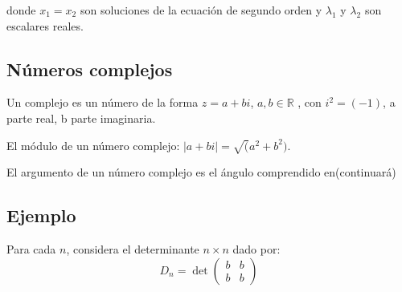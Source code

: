 \documentclass{article}
\begin{document}
donde $x_1=x_2$ son soluciones de la ecuación de segundo orden y $\lambda_1$ y $\lambda_2$ son escalares reales.

\subsection{Números  complejos}

Un complejo es un número de la forma $z=a+bi$, $a,b\in\mathbb{R}$ , con $i^2=(-1)$, a parte real, b parte imaginaria.

El módulo de un número complejo: $|a+bi|=\surd(a^2+b^2)$.


El argumento de un número complejo es el ángulo comprendido en(continuará)


\subsection{Ejemplo}

Para cada $n$, considera el determinante $n\times n$ dado por:
\begin{equation}
  \label{eq:1}
  D_n=\det
  \begin{pmatrix}
    b & b\\
    b & b 
  \end{pmatrix}
\end{equation}
\end{document}
